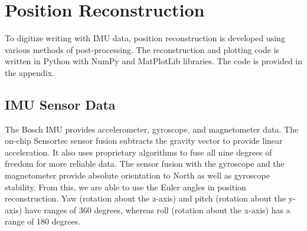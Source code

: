 \documentclass[10pt,journal]{IEEEtran}
\begin{document}
\section{Position Reconstruction}
To digitize writing with IMU data, position reconstruction is developed using various methods of post-processing. The reconstruction and plotting code is written in Python with NumPy and MatPlotLib libraries. The code is provided in the appendix.

\subsection{IMU Sensor Data}
	The Bosch IMU provides accelerometer, gyroscope, and magnetometer data. The on-chip Sensortec sensor fusion subtracts the gravity vector to provide linear acceleration. It also uses proprietary algorithms to fuse all nine degrees of freedom for more reliable data. The sensor fusion with the gyroscope and the magnetometer provide absolute orientation to North as well as gyroscope stability. From this, we are able to use the Euler angles in position reconstruction. Yaw (rotation about the z-axis) and pitch (rotation about the y-axis) have ranges of 360 degrees, whereas roll (rotation about the x-axis) has a range of 180 degrees.
\end{document}
